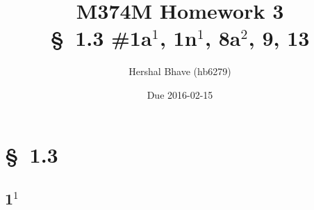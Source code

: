 \documentclass[12pt]{article}
\title{M374M Homework 3 \\
  \normalsize{\S~1.3 \#1a$^1$, 1n$^1$, 8a$^2$, 9, 13}}
\author{Hershal Bhave (hb6279)}
\date{Due 2016-02-15}
\begin{document}
\maketitle

\section{\S~1.3}
\subsection{1$^1$}
\end{document}
